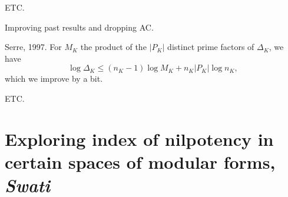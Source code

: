 \documentclass[reqno]{amsart} 
\begin{document}
ETC.

Improving past results and dropping AC.

Serre, 1997.  For $M_K$ the product of the $\lvert P_K \rvert$ distinct prime factors of $\Delta_K$, we have
\begin{equation*}
  \log \Delta_K \leq(n_K - 1) \log M_K + n_K \lvert P_K \rvert \log n_K,
\end{equation*}
which we improve by a bit.

ETC.

\section{Exploring index of nilpotency in certain spaces of modular forms, \textnormal{\emph{Swati}}}


{} 
\end{document}
